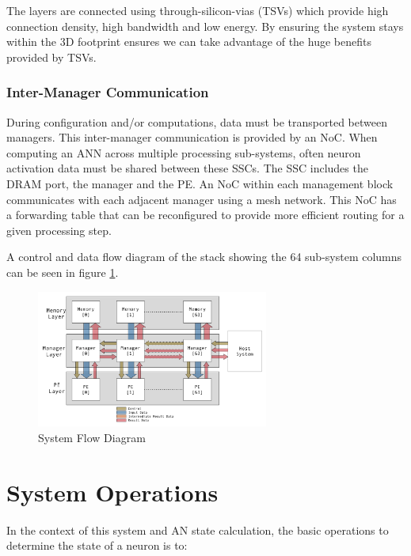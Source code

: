 \documentclass[journal]{IEEEtran}
\begin{document}
The layers are connected using through-silicon-vias (TSVs) which provide high connection density, high bandwidth and low energy.
By ensuring the system stays within the 3D footprint ensures we can take advantage of the huge benefits provided by TSVs.

\subsubsection{Inter-Manager Communication}
\label{ssec:Inter-Manager Communication}

During configuration and/or computations, data must be transported between managers. This inter-manager communication is provided by an NoC.
When computing an ANN across multiple processing sub-systems, often neuron activation data must be shared between these SSCs. The SSC includes the DRAM port, the manager and the PE. An NoC within each management block communicates with each adjacent manager using a mesh network. This NoC has a forwarding table that can be reconfigured to provide more efficient routing for a given processing step.

A control and data flow diagram of the stack showing the 64 sub-system columns can be seen in figure \ref{fig:FlowDiagram}.
\begin{figure}[!t]
\centering
\captionsetup{justification=centering}
\centerline{
\mbox{\includegraphics[width=3.0in]{FlowDiagram.jpg}}
}
\center\caption{System Flow Diagram}
\label{fig:FlowDiagram}
\end{figure}


\section{System Operations}
\label{sec:System Operations}
In the context of this system and AN state calculation, the basic operations to determine the state of a neuron is to:
\end{document}
